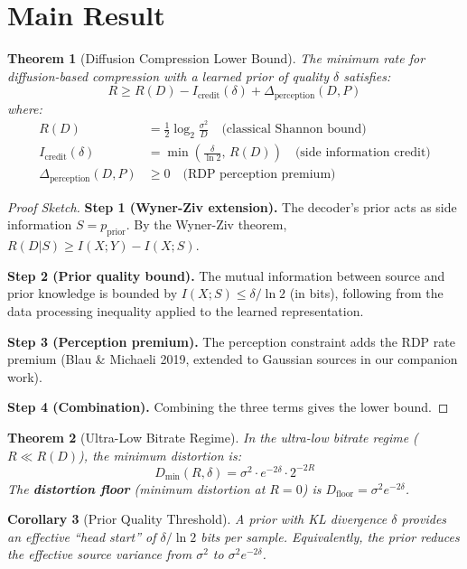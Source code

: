 \documentclass[11pt]{article}
\newtheorem{theorem}{Theorem}[section]
\newtheorem{corollary}[theorem]{Corollary}
\begin{document}
\section{Main Result}

\begin{theorem}[Diffusion Compression Lower Bound]
\label{thm:main}
The minimum rate for diffusion-based compression with a learned prior of quality $\delta$ satisfies:
\[
R \geq R(D) - I_{\text{credit}}(\delta) + \Delta_{\text{perception}}(D, P)
\]
where:
\begin{align}
R(D) &= \frac{1}{2}\log_2\frac{\sigma^2}{D} \quad \text{(classical Shannon bound)} \\
I_{\text{credit}}(\delta) &= \min\!\left(\frac{\delta}{\ln 2},\, R(D)\right) \quad \text{(side information credit)} \\
\Delta_{\text{perception}}(D, P) &\geq 0 \quad \text{(RDP perception premium)}
\end{align}
\end{theorem}

\begin{proof}[Proof Sketch]
\textbf{Step 1 (Wyner-Ziv extension).} The decoder's prior acts as side information $S = p_{\text{prior}}$. By the Wyner-Ziv theorem, $R(D|S) \geq I(X; Y) - I(X; S)$.

\textbf{Step 2 (Prior quality bound).} The mutual information between source and prior knowledge is bounded by $I(X; S) \leq \delta / \ln 2$ (in bits), following from the data processing inequality applied to the learned representation.

\textbf{Step 3 (Perception premium).} The perception constraint adds the RDP rate premium (Blau \& Michaeli 2019, extended to Gaussian sources in our companion work).

\textbf{Step 4 (Combination).} Combining the three terms gives the lower bound.
\end{proof}

\begin{theorem}[Ultra-Low Bitrate Regime]
\label{thm:ultra}
In the ultra-low bitrate regime ($R \ll R(D)$), the minimum distortion is:
\[
D_{\min}(R, \delta) = \sigma^2 \cdot e^{-2\delta} \cdot 2^{-2R}
\]
The \textbf{distortion floor} (minimum distortion at $R = 0$) is $D_{\text{floor}} = \sigma^2 e^{-2\delta}$.
\end{theorem}

\begin{corollary}[Prior Quality Threshold]
A prior with KL divergence $\delta$ provides an effective ``head start'' of $\delta / \ln 2$ bits per sample. Equivalently, the prior reduces the effective source variance from $\sigma^2$ to $\sigma^2 e^{-2\delta}$.
\end{corollary}
\end{document}
